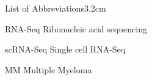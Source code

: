 \begin{mclistof}{List of Abbreviations}{3.2cm}

\item[RNA-Seq] Ribonucleic acid sequencing

\item[scRNA-Seq] Single cell RNA-Seq

\item[MM] Multiple Myeloma

\end{mclistof} 
